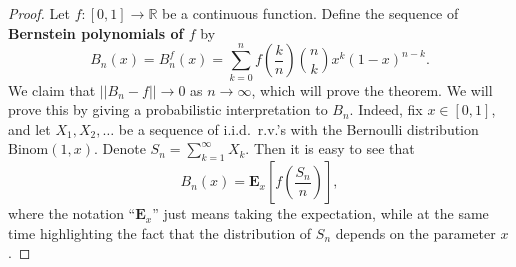 \documentclass[12pt]{article}
\newcommand{\R}{\mathbb{R}}
\newcommand{\expec}{\mathbf{E}}
\theoremstyle{example}
\begin{document}
\begin{proof}
Let $f:[0,1]\to\R$ be a continuous function. Define the sequence of \textbf{Bernstein polynomials of $f$} by
$$ B_n(x)= B_n^f(x) = \sum_{k=0}^n f\left(\frac{k}{n}\right) \binom{n}{k} x^k (1-x)^{n-k}. $$
We claim that $||B_n-f||\to 0 $ as $n\to\infty$, which will prove the theorem. We will prove this by giving a probabilistic interpretation to $B_n$. Indeed, fix $x\in [0,1]$, and let $X_1,X_2,\ldots$ be a sequence of i.i.d.\ r.v.'s with the Bernoulli distribution $\textrm{Binom}(1,x)$. Denote $S_n=\sum_{k=1}^\infty X_k$. Then it is easy to see that
$$ B_n(x) = \expec_x \left[f\left(\frac{S_n}{n}\right)\right], $$
where the notation ``$\expec_x$'' just means taking the expectation, while at the same time highlighting the fact that the distribution of $S_n$ depends on the parameter $x$.


\end{proof}
\end{document}
